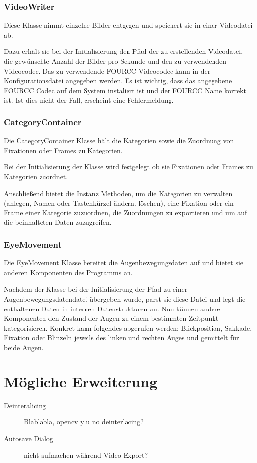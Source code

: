 \documentclass[a4paper,draft]{scrartcl}
\begin{document}
\subsubsection{VideoWriter}
Diese Klasse nimmt einzelne Bilder entgegen und speichert sie in einer Videodatei ab.

Dazu erhält sie bei der Initialisierung den Pfad der zu erstellenden Videodatei, die gewünschte Anzahl der Bilder pro Sekunde und den zu verwendenden Videocodec.
Das zu verwendende FOURCC Videocodec kann in der Konfigurationsdatei angegeben werden. Es ist wichtig, dass das angegebene FOURCC Codec auf dem System instaliert ist und der FOURCC Name korrekt ist. Ist dies nicht der Fall, erscheint eine Fehlermeldung.

\subsubsection{CategoryContainer}
Die CategoryContainer Klasse hält die Kategorien sowie die Zuordnung von Fixationen oder Frames zu Kategorien.

Bei der Initialisierung der Klasse wird festgelegt ob sie Fixationen oder Frames zu Kategorien zuordnet.

Anschließend bietet die Instanz Methoden, um die Kategorien zu verwalten (anlegen, Namen oder Tastenkürzel ändern, löschen), eine Fixation oder ein Frame einer Kategorie zuzuordnen, die Zuordnungen zu exportieren und um auf die beinhalteten Daten zuzugreifen.

\subsubsection{EyeMovement}
Die EyeMovement Klasse bereitet die Augenbewegungsdaten auf und bietet sie anderen Komponenten des Programms an.

Nachdem der Klasse bei der Initialisierung der Pfad zu einer Augenbewegungsdatendatei übergeben wurde, parst sie diese Datei und legt die enthaltenen Daten in internen Datenstrukturen an. Nun können andere Komponenten den Zustand der Augen zu einem bestimmten Zeitpunkt kategorisieren. Konkret kann folgendes abgerufen werden: Blickposition, Sakkade, Fixation oder Blinzeln jeweils des linken und rechten Auges und gemittelt für beide Augen.

\section{M\"ogliche Erweiterung}
  \begin{description}
    \item[Deinteralicing] Blablabla, opencv y u no deinterlacing?
    \item[Autosave Dialog] nicht aufmachen während Video Export?
  \end{description}
\end{document}
